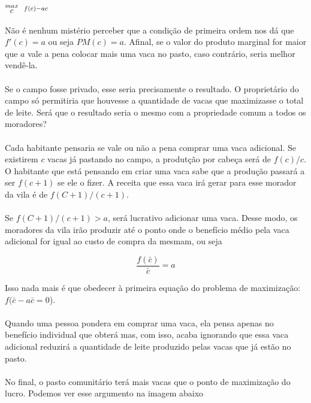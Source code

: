 \documentclass[a4paper,11pt,oneside]{book}
\theoremstyle{definition}
\theoremstyle{break}
\begin{document}
\begin{center}
	\LARGE $ \stackrel{max}{\text{\small $c$}} \ \ %
	\stackrel{f(c) - ac}{\ } $ %
\end{center}

Não é nenhum mistério perceber que a condição de primeira ordem nos dá que $f'(c) = a$ ou seja $PM(c) = a$. Afinal, se o valor do produto marginal for maior que $a$ vale a pena colocar mais uma vaca no pasto, caso contrário, seria melhor vendê-la.
\\~\\
Se o campo fosse privado, esse seria precisamente o resultado. O proprietário do campo só permitiria que houvesse a quantidade de vacas que maximizasse o total de leite. Será que o resultado seria o mesmo com a propriedade comum a todos os moradores?
\\~\\
Cada habitante pensaria se vale ou não a pena comprar uma vaca adicional. Se existirem $c$ vacas já pastando no campo, a produtção por cabeça será de $f(c)/c$. O habitante que está pensando em criar uma vaca sabe que a produção passará a ser $f(c+1)$ se ele o fizer. A receita que essa vaca irá gerar para esse morador da vila é de $f(C+1)/(c+1)$.
\\~\\
Se $f(C+1)/(c+1) > a$, será lucrativo adicionar uma vaca. Desse modo, os moradores da vila irão produzir até o ponto onde o benefício médio pela vaca adicional for igual ao custo de compra da mesmam, ou seja

$$ \frac{f(\bar{c})}{\bar{c}} = a $$

Isso nada mais é que obedecer à primeira equação do problema de maximização: $f(\bar{c} - a\bar{c} = 0$).
\\~\\
Quando uma pessoa pondera em comprar uma vaca, ela pensa apenas no benefício individual que obterá mas, com isso, acaba ignorando que essa vaca adicional reduzirá a quantidade de leite produzido pelas vacas que já estão no pasto.
\\~\\
No final, o pasto comunitário terá mais vacas que o ponto de maximização do lucro. Podemos ver esse argumento na imagem abaixo
\end{document}
